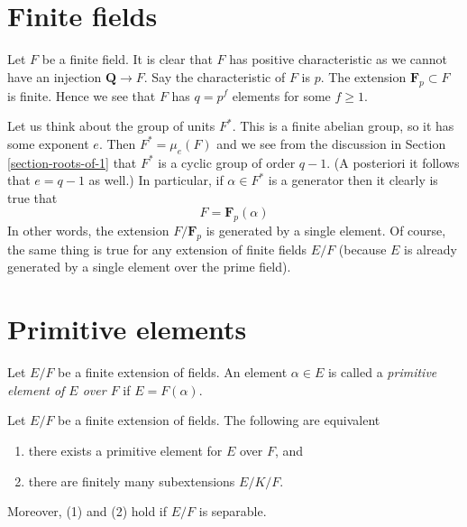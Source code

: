 \section{Finite fields}
\label{section-finite}

\noindent
Let $F$ be a finite field. It is clear that $F$ has positive characteristic
as we cannot have an injection $\mathbf{Q} \to F$. Say the characteristic
of $F$ is $p$. The extension $\mathbf{F}_p \subset F$ is finite.
Hence we see that $F$ has $q = p^f$ elements for some $f \geq 1$.

\medskip\noindent
Let us think about the group of units $F^*$. This is a finite abelian
group, so it has some exponent $e$. Then $F^* = \mu_e(F)$ and we see
from the discussion in Section \ref{section-roots-of-1} that $F^*$
is a cyclic group of order $q - 1$. (A posteriori it follows that
$e = q - 1$ as well.) In particular, if $\alpha \in F^*$ is a generator
then it clearly is true that
$$
F = \mathbf{F}_p(\alpha)
$$
In other words, the extension $F/\mathbf{F}_p$ is generated by a single
element. Of course, the same thing is true for any extension of finite
fields $E/F$ (because $E$ is already generated by a single element over
the prime field).





\section{Primitive elements}
\label{section-primitive-element}

\noindent
Let $E/F$ be a finite extension of fields. An element $\alpha \in E$
is called a {\it primitive element of $E$ over $F$} if $E = F(\alpha)$.

\begin{lemma}
\label{lemma-primitive-element}
Let $E/F$ be a finite extension of fields. The following are equivalent
\begin{enumerate}
\item there exists a primitive element for $E$ over $F$, and
\item there are finitely many subextensions $E/K/F$.
\end{enumerate}
Moreover, (1) and (2) hold if $E/F$ is separable.
\end{lemma}

